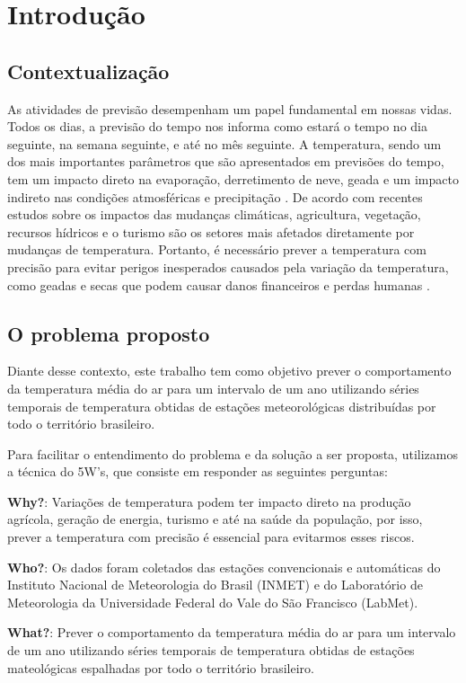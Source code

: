 \chapter{Introdução}

\section{Contextualização}
As atividades de previsão desempenham um papel fundamental em nossas vidas. Todos os dias, a previsão do tempo nos informa como estará o tempo no dia seguinte, na semana seguinte, e até no mês seguinte. A temperatura, sendo um dos mais importantes parâmetros que são apresentados em previsões do tempo, tem um impacto direto na evaporação, derretimento de neve, geada e um impacto indireto nas condições atmosféricas e precipitação \cite{hansen2006global}. De acordo com recentes estudos sobre os impactos das mudanças climáticas, agricultura, vegetação, recursos hídricos e o turismo são os setores mais afetados diretamente por mudanças de temperatura. Portanto, é necessário prever a temperatura com precisão para evitar perigos inesperados causados pela variação da temperatura, como geadas e secas que podem causar danos financeiros e perdas humanas \cite{kaymaz2005hazards}.

\section{O problema proposto}
Diante desse contexto, este trabalho tem como objetivo prever o comportamento da temperatura média do ar para um intervalo de um ano utilizando séries temporais de temperatura obtidas de estações meteorológicas distribuídas por todo o território brasileiro.

Para facilitar o entendimento do problema e da solução a ser proposta, utilizamos a técnica do 5W's, que consiste em responder as seguintes perguntas:

\textbf{Why?}: Variações de temperatura podem ter impacto direto na produção agrícola, geração de energia, turismo e até na saúde da população, por isso, prever a temperatura com precisão é essencial para evitarmos esses riscos.

\textbf{Who?}: Os dados foram coletados das estações convencionais e automáticas do Instituto Nacional de Meteorologia do Brasil (INMET) e do Laboratório de Meteorologia da Universidade Federal do Vale do São Francisco (LabMet).

\textbf{What?}: Prever o comportamento da temperatura média do ar para um intervalo de um ano utilizando séries temporais de temperatura obtidas de estações mateológicas espalhadas por todo o território brasileiro.


